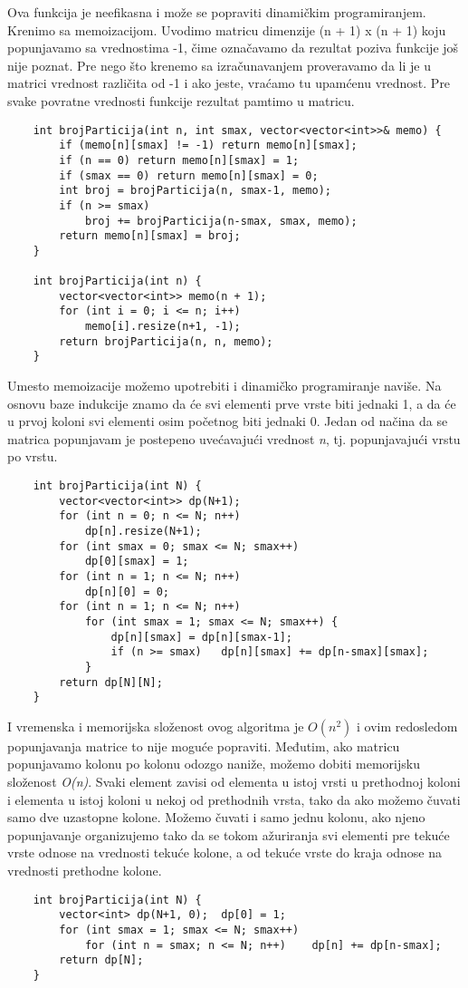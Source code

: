 \documentclass{article}
\begin{document}
Ova funkcija je neefikasna i može se popraviti dinamičkim programiranjem.
Krenimo sa memoizacijom. Uvodimo matricu dimenzije (n + 1) x (n + 1) koju
popunjavamo sa vrednostima -1, čime označavamo da rezultat poziva funkcije
još nije poznat. Pre nego što krenemo sa izračunavanjem proveravamo da li je u
matrici vrednost različita od -1 i ako jeste, vraćamo tu upamćenu vrednost. Pre
svake povratne vrednosti funkcije rezultat pamtimo u matricu.
\begin{lstlisting}
    int brojParticija(int n, int smax, vector<vector<int>>& memo) {
        if (memo[n][smax] != -1) return memo[n][smax];
        if (n == 0) return memo[n][smax] = 1;
        if (smax == 0) return memo[n][smax] = 0;
        int broj = brojParticija(n, smax-1, memo);
        if (n >= smax)
            broj += brojParticija(n-smax, smax, memo);
        return memo[n][smax] = broj;
    }

    int brojParticija(int n) {
        vector<vector<int>> memo(n + 1);
        for (int i = 0; i <= n; i++)
            memo[i].resize(n+1, -1);
        return brojParticija(n, n, memo);
    }
\end{lstlisting}
Umesto memoizacije možemo upotrebiti i dinamičko programiranje naviše. Na osnovu baze indukcije znamo da će svi elementi prve vrste biti jednaki 1, a da
će u prvoj koloni svi elementi osim početnog biti jednaki 0. Jedan od načina da
se matrica popunjavam je postepeno uvećavajući vrednost \textit{n}, tj. popunjavajući
vrstu po vrstu.
\begin{lstlisting}
    int brojParticija(int N) {
        vector<vector<int>> dp(N+1);
        for (int n = 0; n <= N; n++)
            dp[n].resize(N+1);
        for (int smax = 0; smax <= N; smax++)
            dp[0][smax] = 1;
        for (int n = 1; n <= N; n++)
            dp[n][0] = 0;
        for (int n = 1; n <= N; n++)
            for (int smax = 1; smax <= N; smax++) {
                dp[n][smax] = dp[n][smax-1];
                if (n >= smax)   dp[n][smax] += dp[n-smax][smax];
            }
        return dp[N][N];
    }
\end{lstlisting}
I vremenska i memorijska složenost ovog algoritma je $O(n^2)$ i ovim redosledom
popunjavanja matrice to nije moguće popraviti. Međutim, ako matricu
popunjavamo kolonu po kolonu odozgo naniže, možemo dobiti memorijsku
složenost \textit{O(n)}. Svaki element zavisi od elementa u istoj vrsti u prethodnoj
koloni i elementa u istoj koloni u nekoj od prethodnih vrsta, tako da ako možemo čuvati samo dve uzastopne kolone. Možemo čuvati i samo jednu kolonu, ako njeno popunjavanje organizujemo
tako da se tokom ažuriranja svi elementi pre tekuće vrste odnose na vrednosti
tekuće kolone, a od tekuće vrste do kraja odnose na vrednosti prethodne kolone.
\begin{lstlisting}
    int brojParticija(int N) {
        vector<int> dp(N+1, 0);  dp[0] = 1;
        for (int smax = 1; smax <= N; smax++)
            for (int n = smax; n <= N; n++)    dp[n] += dp[n-smax];
        return dp[N];
    }
\end{lstlisting}
\end{document}
